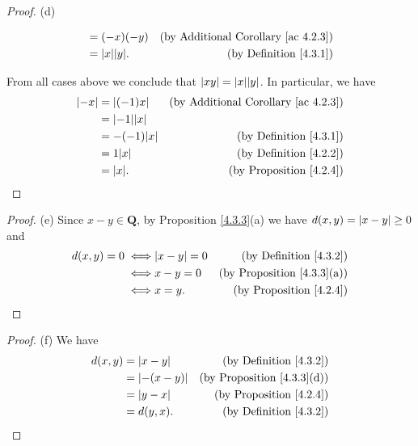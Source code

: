 \begin{proof}{(d)}
\begin{itemize}
\begin{itemize}
\begin{align*}
                                      & = (-x)(-y)           & \text{(by Additional Corollary \ref{ac 4.2.3})} \\
                                      & = \abs*{x} \abs*{y}. & \text{(by Definition \ref{4.3.1})}
                        \end{align*}
              \end{itemize}
    \end{itemize}
    From all cases above we conclude that \(\abs*{xy} = \abs*{x} \abs*{y}\).
    In particular, we have
    \begin{align*}
        \abs*{-x} & = \abs*{(-1)x}       & \text{(by Additional Corollary \ref{ac 4.2.3})} \\
                  & = \abs*{-1} \abs*{x}                                                   \\
                  & = -(-1) \abs*{x}     & \text{(by Definition \ref{4.3.1})}              \\
                  & = 1 \abs*{x}         & \text{(by Definition \ref{4.2.2})}              \\
                  & = \abs*{x}.          & \text{(by Proposition \ref{4.2.4})}
    \end{align*}
\end{proof}

\begin{proof}{(e)}
    Since \(x - y \in \mathbf{Q}\), by Proposition \ref{4.3.3}(a) we have \(d(x, y) = \abs*{x - y} \geq 0\) and
    \begin{align*}
        d(x, y) = 0
        \iff & \abs*{x - y} = 0 & \text{(by Definition \ref{4.3.2})}     \\
        \iff & x - y = 0        & \text{(by Proposition \ref{4.3.3}(a))} \\
        \iff & x = y.           & \text{(by Proposition \ref{4.2.4})}
    \end{align*}
\end{proof}

\begin{proof}{(f)}
    We have
    \begin{align*}
        d(x, y) & = \abs*{x - y}    & \text{(by Definition \ref{4.3.2})}     \\
                & = \abs*{-(x - y)} & \text{(by Proposition \ref{4.3.3}(d))} \\
                & = \abs*{y - x}    & \text{(by Proposition \ref{4.2.4})}    \\
                & = d(y, x).        & \text{(by Definition \ref{4.3.2})}
    \end{align*}
\end{proof}


